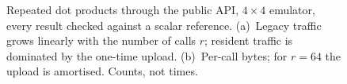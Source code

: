 \begin{figure}[t]
  \centering
  \resizebox{\columnwidth}{!}{}
  \caption{Repeated dot products through the public API, $4\times4$
  emulator, every result checked against a scalar reference. (a)~Legacy
  traffic grows linearly with the number of calls $r$; resident traffic is
  dominated by the one-time upload. (b)~Per-call bytes; for $r=64$ the
  upload is amortised. Counts, not times.}
  \label{fig:scaling}
\end{figure}
